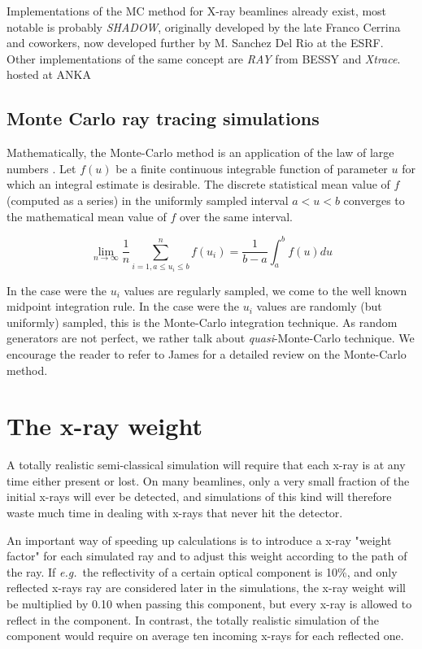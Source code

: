 Implementations of the MC method for X-ray beamlines already exist, most
notable is probably \textit{SHADOW}\cite{welnak1994shadow}, originally developed by the late Franco
Cerrina and coworkers, now developed further by M. Sanchez Del Rio at the ESRF\cite{sanchez2011shadow3}\cite{shadow_website}.
Other implementations of the same concept are \textit{RAY}\cite{schaefers2008bessy} from BESSY and \textit{Xtrace}\cite{bauer2007simulation}.
hosted at ANKA

\subsection{Monte Carlo ray tracing simulations}
Mathematically, the Monte-Carlo method is an application of the law of large numbers \cite{James80,Grimmett92}. Let $f(u)$ be a finite continuous integrable function of parameter $u$ for which an integral estimate is desirable. The discrete statistical mean value of $f$ (computed as a series) in the uniformly sampled interval $a < u < b$ converges to the mathematical mean value of $f$ over the same interval.

\begin{equation}
\lim_{n \rightarrow \infty} \frac{1}{n} \sum_{i=1, a \leq u_i \leq b}^n f(u_i) = \frac{1}{b-a}\int_a^b f(u) du
\end{equation}

In the case were the $u_i$ values are regularly sampled, we come to the well known midpoint integration rule. In the case were the $u_i$ values are randomly (but uniformly) sampled, this is the Monte-Carlo integration technique. As random generators are not perfect, we rather talk about \emph{quasi}-Monte-Carlo technique. We encourage the reader to refer to James \cite{James80} for a detailed review on the Monte-Carlo method.

\section{The x-ray weight}
\label{s:probweight}
A totally realistic semi-classical simulation will require that
each x-ray is at any time either present or lost.
On many beamlines, only a very
small fraction of the initial x-rays will ever be detected, and
simulations of this kind will therefore waste much time in dealing
with x-rays that never hit the detector.

An important way of speeding up calculations is to introduce
a x-ray "weight factor" for each simulated ray and to
adjust this weight according to the path of the ray.
If {\em e.g.}\ the reflectivity of a certain
optical component is 10\%, and only reflected x-rays ray are
considered later in the simulations, the x-ray
weight will be multiplied by 0.10 when passing this component,
but every x-ray is allowed to reflect in the component.
In contrast, the totally realistic simulation of the component
would require on average ten incoming x-rays for each reflected one.

